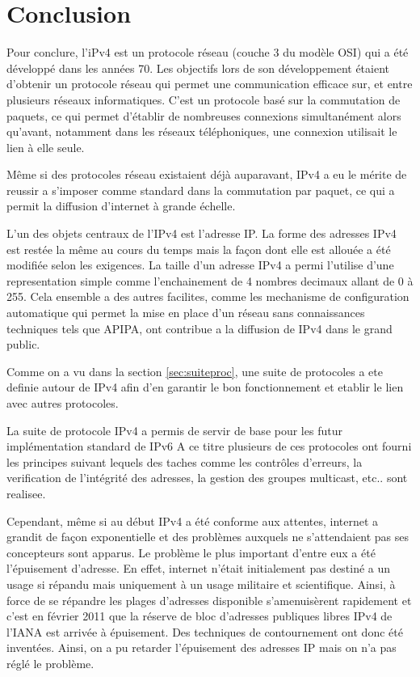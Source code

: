 \section{Conclusion}

Pour conclure, l'iPv4 est un protocole réseau (couche 3 du modèle OSI) qui a
été développé dans les années 70. Les objectifs lors de son développement
étaient d'obtenir un protocole réseau qui permet une communication efficace
sur, et entre plusieurs réseaux informatiques. C'est un protocole basé sur la
commutation de paquets, ce qui permet d'établir de nombreuses connexions
simultanément alors qu'avant, notamment dans les réseaux téléphoniques, une
connexion utilisait le lien à elle seule. 

\smallbreak
Même si des protocoles réseau existaient déjà auparavant, IPv4 a eu le mérite
de reussir a s'imposer comme standard dans la commutation par paquet, ce qui a
permit la diffusion d'internet à grande échelle.

\smallbreak
L'un des objets centraux de l'IPv4 est l'adresse IP.  La forme des adresses
IPv4 est restée la même au cours du temps mais la façon dont elle est allouée a
été modifiée selon les exigences.  La taille d'un adresse IPv4 a permi
l'utilise d'une representation simple comme l'enchainement de 4 nombres
decimaux allant de 0 à 255.  Cela ensemble a des autres facilites, comme les
mechanisme de configuration automatique qui permet la mise en place d'un réseau
sans connaissances techniques tels que APIPA, ont contribue a la diffusion de
IPv4 dans le grand public.
\smallbreak

Comme on a vu dans la section \ref{sec:suiteproc}, une suite de protocoles a
ete definie autour de IPv4 afin d'en garantir le bon fonctionnement et etablir
le lien avec autres protocoles.

La suite de protocole IPv4 a permis de servir de base pour les futur
implémentation standard de IPv6 A ce titre plusieurs de ces protocoles ont
fourni les principes suivant lequels des taches comme les contrôles d'erreurs,
la verification de l'intégrité des adresses, la gestion des groupes multicast,
etc.. sont realisee.
\smallbreak


Cependant, même si au début IPv4 a été conforme aux attentes, internet a
grandit de façon exponentielle et des problèmes auxquels ne s'attendaient pas
ses concepteurs sont apparus.
Le problème le plus important d'entre eux a été l'épuisement d'adresse. En
effet, internet n'était initialement pas destiné a un usage si répandu mais
uniquement à un usage militaire et scientifique.  Ainsi, à force de se répandre
les plages d'adresses disponible s'amenuisèrent rapidement et c'est en février
2011 que la réserve de bloc d'adresses publiques libres IPv4 de l'IANA est
arrivée à épuisement. Des techniques de contournement ont donc été inventées.
Ainsi, on a pu retarder l'épuisement des adresses IP mais on n'a pas réglé le
problème.

